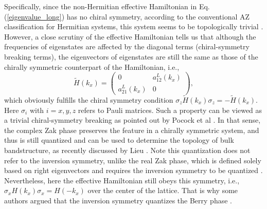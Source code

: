 \documentclass[aps,pra,reprint,groupedaddress,nofootinbib,longbibliography,showpacs]{revtex4-1}
\begin{document}
Specifically, since the non-Hermitian effective Hamiltonian in Eq.(\ref{eigenvalue_long}) has no chiral symmetry, according to the conventional AZ classification for Hermitian systems, this system seems to be topologically trivial \cite{schnyderPRB2008,asboth2016short}. However, a close scrutiny of the effective Hamiltonian tells us that although the frequencies of eigenstates are affected by the diagonal terms (chiral-symmetry breaking terms), the eigenvectors of eigenstates are still the same as those of the chirally symmetric counterpart  of the Hamiltonian, i.e., 
\begin{equation}
\tilde{H}(k_x)=\left(\begin{matrix}0 & a_{12}^{L}(k_x)\\
a_{21}^{L}(k_x) & 0\end{matrix}\right),
\end{equation}
which obviously fulfills the chiral symmetry condition $\sigma_z\tilde{H}(k_x)\sigma_z=-\tilde{H}(k_x)$. Here $\sigma_i$ with $i=x,y,z$ refers to Pauli matrices. Such a property can be viewed as a trivial chiral-symmetry breaking as pointed out by Pocock et al \cite{pocockArxiv2017}. In that sense, the complex Zak phase preserves the feature in a chirally symmetric system, and thus is still quantized and can be used to determine the topology of bulk bandstructure, as recently discussed by Lieu \cite{lieuPRB2018}. Note this quantization does not refer to the inversion symmetry, unlike the real Zak phase, which is defined solely based on right eigenvectors and requires the inversion symmetry to be quantized \cite{lieuPRB2018}. Nevertheless, here the effective Hamiltonian still obeys this symmetry, i.e., $\sigma_xH(k_x)\sigma_x=H(-k_x)$ over the center of the lattice. That is why some authors argued that the inversion symmetry quantizes the Berry phase \cite{downing2018topological}.
\end{document}
